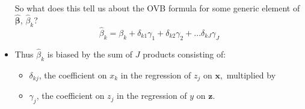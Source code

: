 \documentclass[11pt]{article}
\begin{document}
\begin{itemize}
\bigskip So what does this tell us about the OVB formula for some generic
element of $\widehat{\mathbf{\beta }}$, $\widehat{\beta }_{k}$? \ 
\begin{equation*}
\widehat{\beta }_{k}=\beta _{k}+\delta _{k1}\gamma _{1}+\delta _{k2}\gamma
_{2}+...\delta _{kJ}\gamma _{J}
\end{equation*}

\item Thus $\widehat{\beta }_{k}$ is biased by the sum of $J$ products
consisting of:

\begin{itemize}
\item $\delta _{kj}$, the coefficient on $x_{k}$ in the regression of $z_{j}$
on $\mathbf{x,}$ multiplied by

\item $\gamma _{j}$, the coefficient on $z_{j}$ in the regression of $y$ on $%
\mathbf{z}$.
\end{itemize}
\end{itemize}
\end{document}
